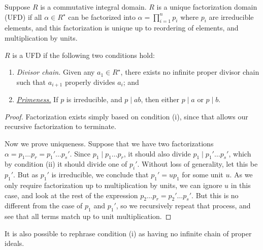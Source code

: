 \begin{definition}
    Suppose \(R\) is a commutative integral domain.
    \(R\) is a unique factorization domain (UFD)
    if all \(\alpha \in R^\star\) can be factorized into
    \(\alpha = \prod_{i=1}^n p_i\) where \(p_i\) are irreducible elements,
    and this factorization is unique up to reordering of elements,
    and multiplication by units.
\end{definition}
\begin{theorem}\label{thm:ufd-conditions}
    \(R\) is a UFD if the following two conditions hold:
    \begin{enumerate}[label={(\roman*)}, itemsep=0mm]
        \item \textit{Divisor chain.}
            Given any \(a_1 \in R^\star\),
            there exists no infinite proper divisor chain
            such that \(a_{i+1}\) properly divides \(a_i\); and
        \item \textit{\hyperref[lem:euclid]{Primeness.}}
            If \(p\) is irreducible, and \(p \mid ab\),
            then either \(p \mid a\) or \(p \mid b\).
    \end{enumerate}
\end{theorem}
\begin{proof}
    Factorization exists simply based on condition (i),
    since that allows our recursive factorization to terminate.

    Now we prove uniqueness.
    Suppose that we have two factorizations
    \(\alpha = p_1 \hdots p_r = p_1' \hdots p_s'\).
    Since \(p_1 \mid p_1 \hdots p_r\),
    it should also divide \(p_1 \mid p_1' \hdots p_s'\),
    which by condition (ii) it should divide one of \(p_i'\).
    Without loss of generality, let this be \(p_1'\).
    But as \(p_1'\) is irreducible,
    we conclude that \(p_1' = up_1\) for some unit \(u\).
    As we only require factorization up to multiplication by units,
    we can ignore \(u\) in this case,
    and look at the rest of the expression \(p_2 \hdots p_r = p_2' \hdots p_s'\).
    But this is no different from the case of \(p_1\) and \(p_1'\),
    so we recursively repeat that process,
    and see that all terms match up to unit multiplication.
\end{proof}
\begin{remark}
    It is also possible to rephrase condition (i)
    as having no infinite chain of proper ideals.
\end{remark}

